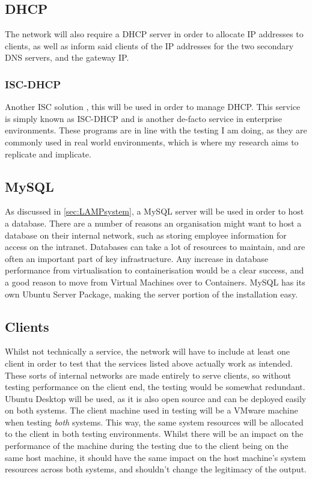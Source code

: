 \subsection{DHCP}
\label{DHCP Spec}
The network will also require a DHCP server in order to allocate IP addresses to clients, as well as inform said clients of the IP addresses for the two secondary DNS servers, and the gateway IP.

\subsubsection{ISC-DHCP}
Another ISC solution \citep{ISCtimeline}, this will be used in order to manage DHCP. This service is simply known as ISC-DHCP and is another de-facto service in enterprise environments. These programs are in line with the testing I am doing, as they are commonly used in real world environments, which is where my research aims to replicate and implicate.

\subsection{MySQL}
\label{MySQL Server}
As discussed in \ref{sec:LAMPsystem}, a MySQL server will be used in order to host a database. There are a number of reasons an organisation might want to host a database on their internal network, such as storing employee information for access on the intranet. Databases can take a lot of resources to maintain, and are often an important part of key infrastructure. Any increase in database performance from virtualisation to containerisation would be a clear success, and a good reason to move from Virtual Machines over to Containers. MySQL has its own Ubuntu Server Package, making the server portion of the installation easy.

\subsection{Clients}
Whilst not technically a service, the network will have to include at least one client in order to test that the services listed above actually work as intended. These sorts of internal networks are made entirely to serve clients, so without testing performance on the client end, the testing would be somewhat redundant. Ubuntu Desktop will be used, as it is also open source and can be deployed easily on both systems. The client machine used in testing will be a VMware machine when testing \emph{both} systems. This way, the same system resources will be allocated to the client in both testing environments. Whilst there will be an impact on the performance of the machine during the testing due to the client being on the same host machine, it should have the same impact on the host machine's system resources across both systems, and shouldn't change the legitimacy of the output.


